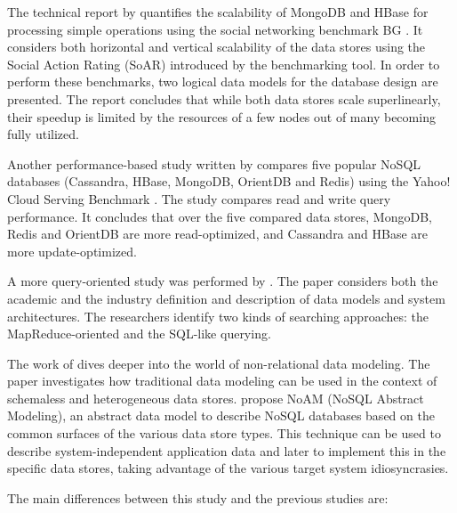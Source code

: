 The technical report by \textcite{Barahmand2015} quantifies the scalability of MongoDB and HBase for processing simple operations using the social networking benchmark BG \autocite{Barahmand2013}. It considers both horizontal and vertical scalability of the data stores using the Social Action Rating (SoAR) introduced by the benchmarking tool.
In order to perform these benchmarks, two logical data models for the database design are presented. The report concludes that while both data stores scale superlinearly, their speedup is limited by the resources of a few nodes out of many becoming fully utilized.

Another performance-based study written by \textcite{Abramova2014} compares five popular NoSQL databases (Cassandra, HBase, MongoDB, OrientDB and Redis) using the Yahoo! Cloud Serving Benchmark \autocite{Yahoo2010}. The study compares read and write query performance. It concludes that over the five compared data stores, MongoDB, Redis and OrientDB are more read-optimized, and Cassandra and HBase are more update-optimized.

A more query-oriented study was performed by \textcite{Zhou2013}. The paper considers both the academic and the industry definition and description of data models and system architectures. The researchers identify two kinds of searching approaches: the MapReduce-oriented and the SQL-like querying.

The work of \textcite{Atzeni2016} dives deeper into the world of non-relational data modeling. The paper investigates how traditional data modeling can be used in the context of schemaless and heterogeneous data stores. \citeauthor{Atzeni2016} propose NoAM (NoSQL Abstract Modeling), an abstract data model to describe NoSQL databases based on the common surfaces of the various data store types. This technique can be used to describe system-independent application data and later to implement this in the specific data stores, taking advantage of the various target system idiosyncrasies.


The main differences between this study and the previous studies are:

